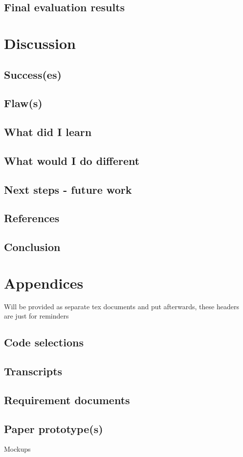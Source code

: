 \documentclass[]{report}
\begin{document}
\section{Final evaluation results}

\chapter{Discussion}

\section{Success(es)}

\section{Flaw(s)}

\section{What did I learn}

\section{What would I do different}

\section{Next steps - future work}

\section{References}

{}



\section{Conclusion}

\chapter{Appendices}

Will be provided as separate tex documents and put afterwards, these headers are
just for reminders

\section{Code selections}

\section{Transcripts}

\section{Requirement documents}

\section{Paper prototype(s)}

Mockups\cite{site:mockups}
\end{document}

